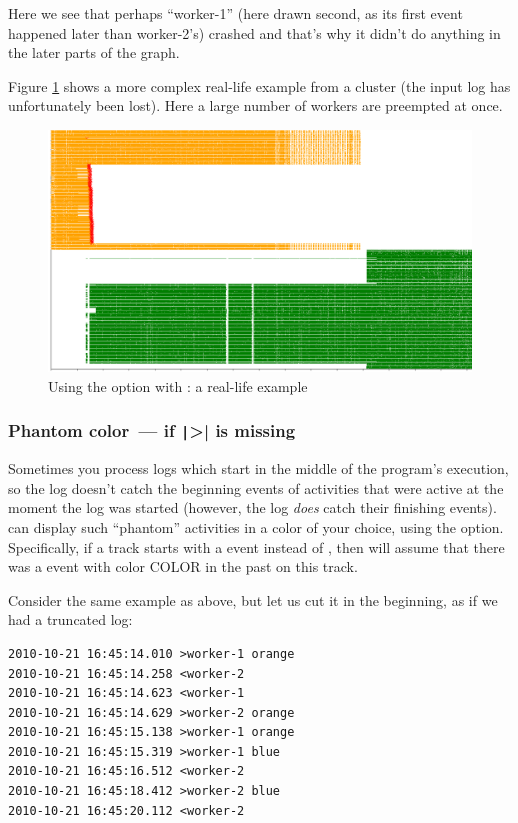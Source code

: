 \documentclass{article}
\begin{document}
Here we see that perhaps ``worker-1'' (here drawn second, as its first event happened later than worker-2's) crashed and that's why it didn't do anything in the later parts of the graph.

Figure \ref{fig:splot-expire-large-example} shows a more complex real-life example from a cluster (the input log has unfortunately been lost). Here a large number of workers are preempted at once.

\begin{figure}
\center
\includegraphics[width=\textwidth]{pics/splot/splot-expire-large-example.png}
\caption{Using the  option with \splot{}: a real-life example}
\label{fig:splot-expire-large-example}
\end{figure}

\subsubsection{Phantom color~--- if \texttt|>| is missing}

Sometimes you process logs which start in the middle of the program's execution, so the log doesn't catch the beginning events of activities that were active at the moment the log was started (however, the log \emph{does} catch their finishing events). \splot{} can display such ``phantom'' activities in a color of your choice, using the  option. Specifically, if a track starts with a \hlverb{<} event instead of \hlverb{>}, then \splot{} will assume that there was a \hlverb{>} event with color COLOR in the past on this track.

Consider the same example as above, but let us cut it in the beginning, as if we had a truncated log:

\begin{verbatim}
2010-10-21 16:45:14.010 >worker-1 orange
2010-10-21 16:45:14.258 <worker-2
2010-10-21 16:45:14.623 <worker-1
2010-10-21 16:45:14.629 >worker-2 orange
2010-10-21 16:45:15.138 >worker-1 orange
2010-10-21 16:45:15.319 >worker-1 blue
2010-10-21 16:45:16.512 <worker-2
2010-10-21 16:45:18.412 >worker-2 blue
2010-10-21 16:45:20.112 <worker-2
\end{verbatim}
\end{document}
